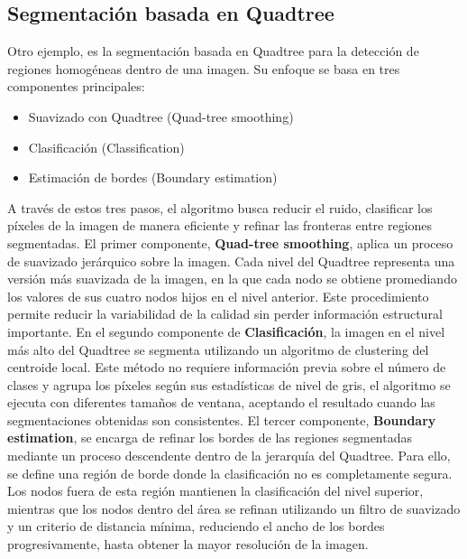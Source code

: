 \documentclass[9pt,a4paper,twoside]{rho-class/rho}
\begin{document}
        \subsection{Segmentación basada en Quadtree}
            Otro ejemplo, es la segmentación basada en Quadtree para la detección de regiones homogéneas dentro de una imagen. Su enfoque se basa en tres componentes principales:
            \begin{itemize}
                \item Suavizado con Quadtree (Quad-tree smoothing)
                \item Clasificación (Classification)
                \item Estimación de bordes (Boundary estimation)
            \end{itemize}
            A través de estos tres pasos, el algoritmo busca reducir el ruido, clasificar los píxeles de la imagen de manera eficiente y refinar las fronteras entre regiones segmentadas.
            El primer componente, \textbf{Quad-tree smoothing}, aplica un proceso de suavizado jerárquico sobre la imagen. Cada nivel del Quadtree representa una versión más suavizada de la imagen, en la que cada nodo se obtiene promediando los valores de sus cuatro nodos hijos en el nivel anterior. Este procedimiento permite reducir la variabilidad de la calidad sin perder información estructural importante.
            En el segundo componente de \textbf{Clasificación}, la imagen en el nivel más alto del Quadtree se segmenta utilizando un algoritmo de clustering del centroide local. Este método no requiere información previa sobre el número de clases y agrupa los píxeles según sus estadísticas de nivel de gris, el algoritmo se ejecuta con diferentes tamaños de ventana, aceptando el resultado cuando las segmentaciones obtenidas son consistentes.
            El tercer componente, \textbf{Boundary estimation}, se encarga de refinar los bordes de las regiones segmentadas mediante un proceso descendente dentro de la jerarquía del Quadtree. Para ello, se define una región de borde donde la clasificación no es completamente segura. Los nodos fuera de esta región mantienen la clasificación del nivel superior, mientras que los nodos dentro del área se refinan utilizando un filtro de suavizado y un criterio de distancia mínima, reduciendo el ancho de los bordes progresivamente, hasta obtener la mayor resolución de la imagen. \cite{spann_wilson_quadtree}
\end{document}
